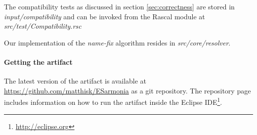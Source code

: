 The compatibility tests as discussed in section \ref{sec:correctness} are stored in \textit{input/compatibility} and can be invoked from the Rascal module at \textit{src/test/Compatibility.rsc}

Our implementation of the \textit{name-fix}\citep{Erdweg2014a} algorithm resides in \textit{src/core/resolver}. 

\paragraph{Getting the artifact}
The latest version of the artifact is available at \url{https://github.com/matthisk/ESarmonia} as a git repository. The repository page includes information on how to run the artifact inside the Eclipse IDE\footnote{\url{http://eclipse.org}}.